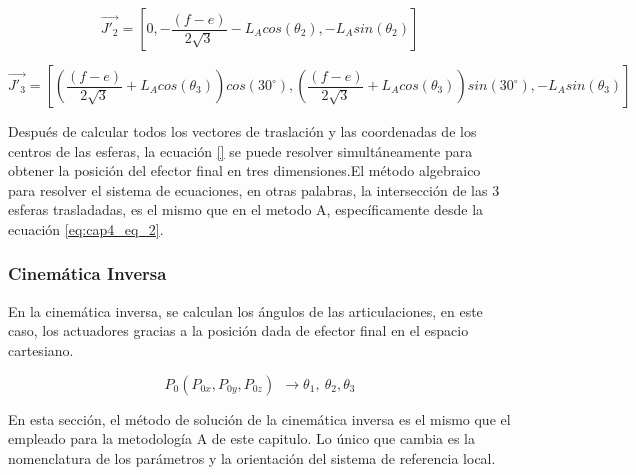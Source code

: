         \begin{equation}
                \overrightarrow{J'_{2}}= \left [  0,-\frac{(f-e)}{2\sqrt{3}}-L_{A}cos(\theta_2),-L_{A}sin(\theta_2)\right]
        \label{eq:cap4_MB_4}
        \end{equation}    
        
        \begin{equation}
                \overrightarrow{J'_{3}}= \left [\left( \frac{(f-e)}{2\sqrt{3}}+{L}_{A}cos(\theta_3)\right) cos(30^\circ), \left(\frac{(f-e)}{2\sqrt{3}} + {L}_{A}cos(\theta_3)\right) sin(30^\circ), -L_{A}sin(\theta_3)\right]
        \label{eq:cap4_MB_5}
        \end{equation}    
  
      Después de calcular todos los vectores de traslación y las coordenadas de los centros de las esferas, la ecuación \ref{} se puede resolver simultáneamente para obtener la posición del efector final en tres dimensiones.El método algebraico para resolver el sistema de ecuaciones, en otras palabras, la intersección de las 3 esferas trasladadas, es el mismo que en el metodo A, específicamente desde la ecuación \ref{eq:cap4_eq_2}.
  
 \newpage
        
        

\subsubsection{Cinemática Inversa}\label{mb_ci}

      En la cinemática inversa, se calculan los ángulos de las articulaciones, en este caso, los actuadores gracias a la posición dada de efector final en el espacio cartesiano. 
      
        \begin{equation}
              P_{0} \left( P_{0x},P_{0y},P_{0z} \right) ~~ \rightarrow    \theta _{1},~ \theta _{2}, \theta _{3} 
        \label{eq:cap4_MB_6}
        \end{equation}\par      
      
     En esta sección, el método de solución de la cinemática inversa es el mismo que el empleado para la metodología A de este capitulo. Lo único que cambia es la nomenclatura de los parámetros y la orientación del sistema de referencia local.
  
